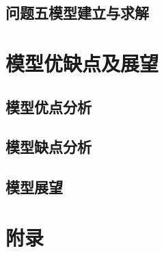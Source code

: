 \documentclass{article}
\begin{document}
\subsection{问题五模型建立与求解}

\section{模型优缺点及展望}

\subsection{模型优点分析}

\subsection{模型缺点分析}

\subsection{模型展望}




\section*{附录}
\vspace{-1em}


\noindent
\end{document}
